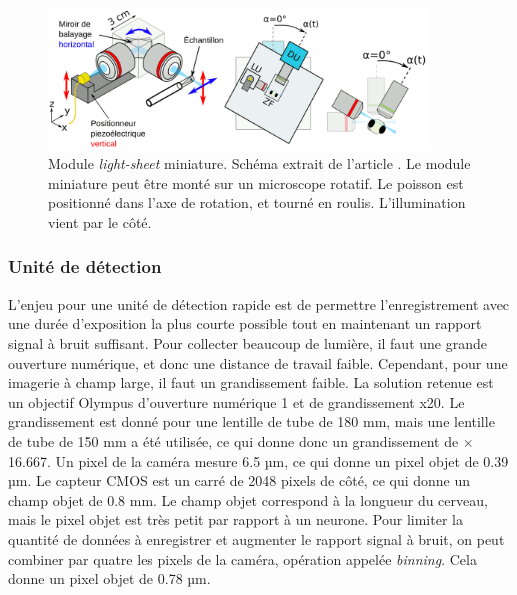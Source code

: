 \begin{figure}[b]
    \centering
    \includegraphics[width=0.9\textwidth]{./files/miniature_light-sheet.svg.png}
    \caption{Module \emph{light-sheet} miniature. Schéma extrait de l'article \cite{migault_whole-brain_2018}. Le module miniature peut être monté sur un microscope rotatif. Le poisson est positionné dans l'axe de rotation, et tourné en roulis. L'illumination vient par le côté.
    \label{FIGminiaturelightsheet}}
    \end{figure}

\subsubsection{Unité de détection}

L'enjeu pour une unité de détection rapide est de permettre l'enregistrement avec une durée d'exposition la plus courte possible tout en maintenant un rapport signal à bruit suffisant. Pour collecter beaucoup de lumière, il faut une grande ouverture numérique, et donc une distance de travail faible. Cependant, pour une imagerie à champ large, il faut un grandissement faible. La solution retenue est un objectif Olympus d'ouverture numérique 1 et de grandissement x20. Le grandissement est donné pour une lentille de tube de 180 mm, mais une lentille de tube de 150 mm a été utilisée, ce qui donne donc un grandissement de $\times$16.667. Un pixel de la caméra mesure 6.5 µm, ce qui donne un pixel objet de 0.39 µm. Le capteur CMOS est un carré de 2048 pixels de côté, ce qui donne un champ objet de 0.8 mm. Le champ objet correspond à la longueur du cerveau, mais le pixel objet est très petit par rapport à un neurone. Pour limiter la quantité de données à enregistrer et augmenter le rapport signal à bruit, on peut combiner par quatre les pixels de la caméra, opération appelée \emph{binning}. Cela donne un pixel objet de 0.78 µm.


